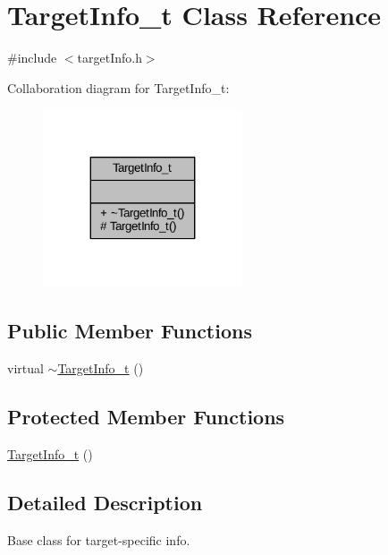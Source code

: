 \hypertarget{class_target_info__t}{}\section{Target\+Info\+\_\+t Class Reference}
\label{class_target_info__t}


{\ttfamily \#include $<$target\+Info.\+h$>$}



Collaboration diagram for Target\+Info\+\_\+t\+:
\nopagebreak
\begin{figure}[H]
\begin{center}
\leavevmode
\includegraphics[width=167pt]{class_target_info__t__coll__graph}
\end{center}
\end{figure}
\subsection*{Public Member Functions}
\begin{DoxyCompactItemize}
\item 
virtual \hyperlink{class_target_info__t_a26dee6ec289410e0dcd51ab6d8785b0b}{$\sim$\+Target\+Info\+\_\+t} ()
\end{DoxyCompactItemize}
\subsection*{Protected Member Functions}
\begin{DoxyCompactItemize}
\item 
\hyperlink{class_target_info__t_a54ea74c5c3ef1b384aa17f0d4ebd52f1}{Target\+Info\+\_\+t} ()
\end{DoxyCompactItemize}


\subsection{Detailed Description}
Base class for target-\/specific info.

